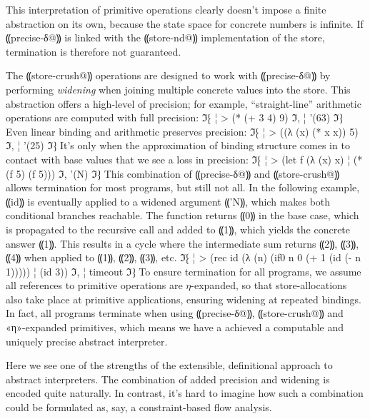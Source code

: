This interpretation of primitive operations clearly doesn't impose a finite
abstraction on its own, because the state space for concrete numbers is
infinite. If ⸨precise-δ@⸩ is linked with the ⸨store-nd@⸩ implementation of the
store, termination is therefore not guaranteed.  

The ⸨store-crush@⸩ operations are designed to work with ⸨precise-δ@⸩ by
performing \emph{widening} when joining multiple concrete values into the
store. This abstraction offers a high-level of precision; for example,
``straight-line'' arithmetic operations are computed with full precision:
ℑ⁅
¦ > (* (+ 3 4) 9)
ℑ,
¦ '(63)
ℑ⁆
Even linear binding and arithmetic preserves precision:
ℑ⁅
¦ > ((λ (x) (* x x)) 5)
ℑ,
¦ '(25)
ℑ⁆
It's only when the approximation of binding structure comes in to
contact with base values that we see a loss in precision:
ℑ⁅
¦ > (let f (λ (x) x)
¦     (* (f 5) (f 5)))
ℑ,
'(N)
ℑ⁆
This combination of ⸨precise-δ@⸩ and ⸨store-crush@⸩ allows termination for most
programs, but still not all. In the following example, ⸨id⸩ is eventually
applied to a widened argument ⸨'N⸩, which makes both conditional branches
reachable. The function returns ⸨0⸩ in the base case, which is propagated to
the recursive call and added to ⸨1⸩, which yields the concrete answer ⸨1⸩.
This results in a cycle where the intermediate sum returns ⸨2⸩, ⸨3⸩, ⸨4⸩ when
applied to ⸨1⸩, ⸨2⸩, ⸨3⸩, etc.
ℑ⁅
¦ > (rec id (λ (n) (if0 n 0 (+ 1 (id (- n 1)))))
¦     (id 3))
ℑ,
¦ timeout
ℑ⁆
To ensure termination for all programs, we assume all references to
primitive operations are $η$-expanded, so that store-allocations also
take place at primitive applications, ensuring widening at repeated
bindings. In fact, all programs terminate when using ⸨precise-δ@⸩,
⸨store-crush@⸩ and «η»-expanded primitives, which means we have a
achieved a computable and uniquely precise abstract interpreter.

Here we see one of the strengths of the extensible, definitional approach to
abstract interpreters. The combination of added precision and widening is
encoded quite naturally. In contrast, it's hard to imagine how such a
combination could be formulated as, say, a constraint-based flow analysis.
